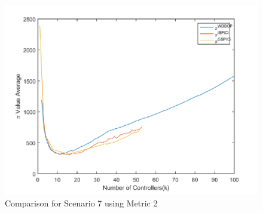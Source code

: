 \documentclass[10pt]{extarticle}
\begin{document}
	\begin{figure}
		\includegraphics[width=\linewidth]{our_comp_7.png}
		\caption{Comparison for Scenario 7 using Metric 2}
		\label{fig:ourcomp7}
	\end{figure}

	
	
\end{document}
